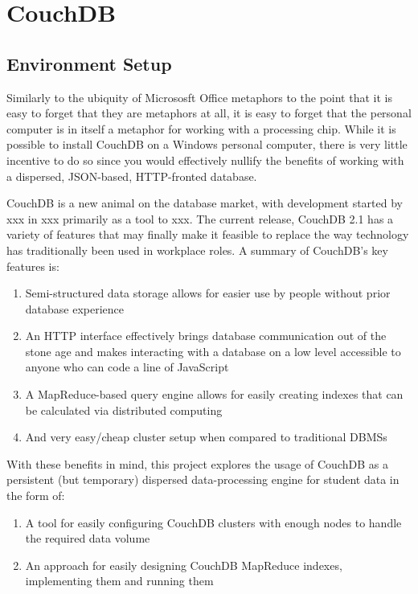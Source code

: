 \section{CouchDB}

\subsection{Environment Setup}
Similarly to the ubiquity of Micrososft Office metaphors to the point that it is easy to forget that they are metaphors at all, it is easy to forget that the personal computer is in itself a metaphor for working with a processing chip. While it is possible to install CouchDB on a Windows personal computer, there is very little incentive to do so since you would effectively nullify the benefits of working with a dispersed, JSON-based, HTTP-fronted database.

CouchDB is a new animal on the database market, with development started by xxx in xxx primarily as a tool to xxx. The current release, CouchDB 2.1 has a variety of features that may finally make it feasible to replace the way technology has traditionally been used in workplace roles. A summary of CouchDB's key features is:

\begin{enumerate}
    \item Semi-structured data storage allows for easier use by people without prior database experience
    \item An HTTP interface effectively brings database communication out of the stone age and makes interacting with a database on a low level accessible to anyone who can code a line of JavaScript
    \item A MapReduce-based query engine allows for easily creating indexes that can be calculated via distributed computing
    \item And very easy/cheap cluster setup when compared to traditional DBMSs
\end{enumerate}

With these benefits in mind, this project explores the usage of CouchDB as a persistent (but temporary) dispersed data-processing engine for student data in the form of:

\begin{enumerate}
    \item A tool for easily configuring CouchDB clusters with enough nodes to handle the required data volume
    \item An approach for easily designing CouchDB MapReduce indexes, implementing them and running them
\end{enumerate}

